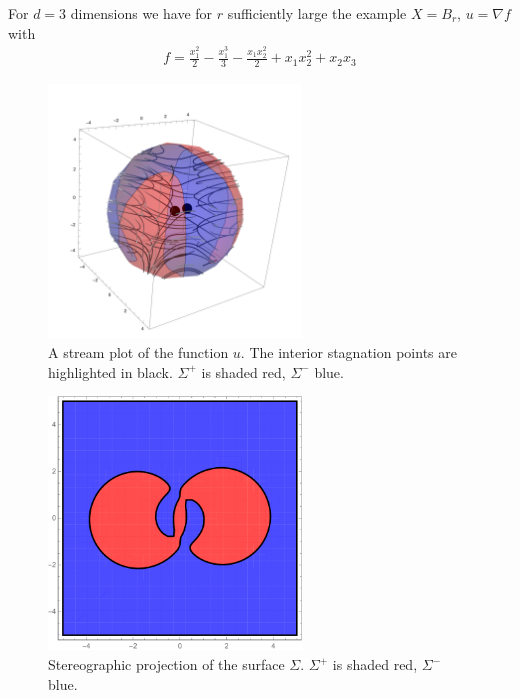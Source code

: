 \begin{frame}
  \begin{example}
    For $d=3$ dimensions we have for $r$ sufficiently large the example $X=B_r$, $u=\nabla f$ with
    \begin{align*}
      f=\frac{x_1^2}{2}-\frac{x_1^3}{3}-\frac{x_1x_2^2}{2}+x_1x_2^2+x_2x_3
    \end{align*}
  \end{example}
\end{frame}

\begin{frame}
  \begin{figure}
    \centering
    \includegraphics[width=0.6\textwidth]{../plots/n3_hf_inflowOutflow_Ball_overview.pdf}
    \caption{A stream plot of the function $u$. The interior stagnation points are highlighted in black.
    $\Sigma^+$ is shaded red, $\Sigma^-$ blue.}
    \label{pl:n3_hf_inflowOutflowStagnationPoint_overview}
  \end{figure}
\end{frame}

\begin{frame}
  \begin{figure}
    \centering
    \includegraphics[width=0.6\textwidth]{../plots/n3_hf_inflowOutflow_Ball_Surface_2.pdf}
    \caption{Stereographic projection of the surface $\Sigma$. $\Sigma^+$ is shaded red, $\Sigma^-$ blue.}
    \label{pl:n3_hf_inflowOutflowStagnationPoint_Surface}
  \end{figure}
\end{frame}

